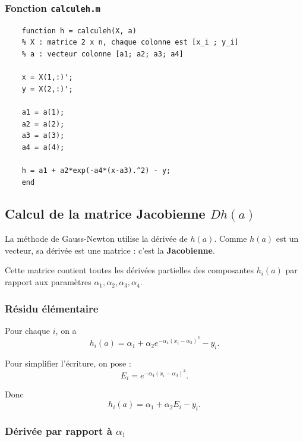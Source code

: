 \documentclass[a4paper,12pt]{article}
\begin{document}
	\subsubsection{Fonction \texttt{calculeh.m}}
	
	\begin{verbatim}
	function h = calculeh(X, a)
	% X : matrice 2 x n, chaque colonne est [x_i ; y_i]
	% a : vecteur colonne [a1; a2; a3; a4]
	
	x = X(1,:)';
	y = X(2,:)';
	
	a1 = a(1);
	a2 = a(2);
	a3 = a(3);
	a4 = a(4);
	
	h = a1 + a2*exp(-a4*(x-a3).^2) - y;
	end
	\end{verbatim}
	
	\subsection{Calcul de la matrice Jacobienne \texorpdfstring{$Dh(a)$}{Dh(a)}}
	
	La méthode de Gauss-Newton \cite{bjorck1996,gauss1809,nocedal2006} utilise la dérivée de $h(a)$.
	Comme $h(a)$ est un vecteur, sa dérivée est une matrice : c'est la \textbf{Jacobienne}.
	
	Cette matrice contient toutes les dérivées partielles des composantes $h_i(a)$ par rapport aux paramètres $\alpha_1,\alpha_2,\alpha_3,\alpha_4$.
	
	\subsubsection{Résidu élémentaire}
	
	Pour chaque $i$, on a
	\begin{equation}
	h_i(a)=\alpha_1+\alpha_2 e^{-\alpha_4(x_i-\alpha_3)^2}-y_i.
	\end{equation}
	
	Pour simplifier l'écriture, on pose :
	\begin{equation}
	E_i=e^{-\alpha_4(x_i-\alpha_3)^2}.
	\end{equation}
	
	Donc
	\begin{equation}
	h_i(a)=\alpha_1+\alpha_2E_i-y_i.
	\end{equation}
	
	\subsubsection{Dérivée par rapport à \texorpdfstring{$\alpha_1$}{a1}}
	
\end{document}
